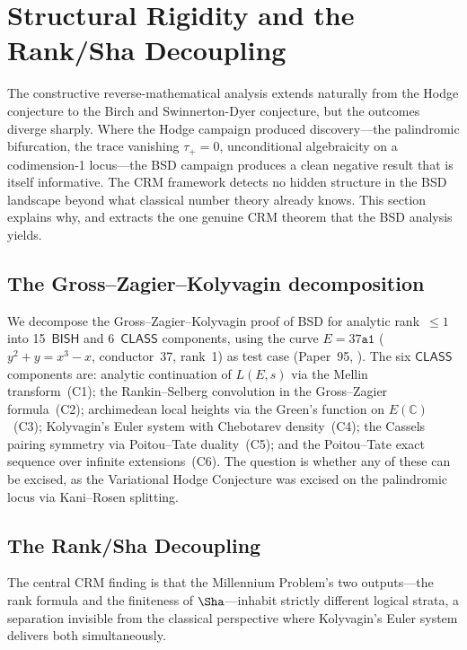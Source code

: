 \documentclass[11pt]{article}
\theoremstyle{plain}
\theoremstyle{definition}
\theoremstyle{remark}
\newcommand{\CC}{\mathbb{C}}
\newcommand{\BISH}{\mathsf{BISH}}
\newcommand{\CLASS}{\mathsf{CLASS}}
\begin{document}
\section{Structural Rigidity and the Rank/Sha Decoupling}
\label{sec:bsd}

The constructive reverse-mathematical analysis extends naturally
from the Hodge conjecture to the Birch and Swinnerton-Dyer
conjecture, but the outcomes diverge sharply.  Where the Hodge
campaign produced discovery---the palindromic bifurcation, the
trace vanishing $\tau_+ = 0$, unconditional algebraicity on a
codimension-1 locus---the BSD campaign produces a clean negative
result that is itself informative.  The CRM framework detects no
hidden structure in the BSD landscape beyond what classical number
theory already knows.  This section explains why, and extracts the
one genuine CRM theorem that the BSD analysis yields.

\subsection{The Gross--Zagier--Kolyvagin decomposition}

We decompose the Gross--Zagier--Kolyvagin proof of BSD for analytic
rank~$\leq 1$ into 15~$\BISH$ and 6~$\CLASS$ components, using
the curve $E = 37\texttt{a1}$ ($y^2 + y = x^3 - x$, conductor~37,
rank~1) as test case (Paper~95, \cite{p95}).  The six $\CLASS$
components are: analytic continuation of $L(E,s)$ via the Mellin
transform~(C1); the Rankin--Selberg convolution in the
Gross--Zagier formula~(C2); archimedean local heights via the
Green's function on $E(\CC)$~(C3); Kolyvagin's Euler system with
Chebotarev density~(C4); the Cassels pairing symmetry via
Poitou--Tate duality~(C5); and the Poitou--Tate exact sequence
over infinite extensions~(C6).  The question is whether any of
these can be excised, as the Variational Hodge Conjecture was
excised on the palindromic locus via Kani--Rosen splitting.

\subsection{The Rank/Sha Decoupling}

The central CRM finding is that the Millennium Problem's two
outputs---the rank formula and the finiteness of
$\Sha$---inhabit strictly
different logical strata, a separation invisible from the
classical perspective where Kolyvagin's Euler system delivers
both simultaneously.
\end{document}
